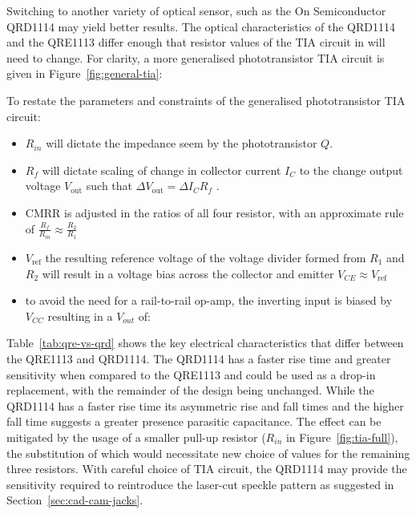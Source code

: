 Switching to another variety of optical sensor, such as the On Semiconductor
QRD1114 \cite{onsemiconductor_qrd1114_2024} may yield better results. The
optical characteristics of the QRD1114 \cite{onsemiconductor_qrd1114_2024} and
the QRE1113 \cite{onsemiconductor_qre1113_2024} differ enough that resistor
values of the TIA circuit in \textcite{mcpherson_portable_2013} will need to
change. For clarity, a more generalised phototransistor TIA circuit is given in
Figure~\ref{fig:general-tia}:

To restate the parameters and constraints of the generalised phototransistor TIA
circuit:

\begin{itemize}
    \item $R_{in}$ will dictate the impedance seem by the phototransistor $Q$.
    \item $R_{f}$ will dictate scaling of change in collector current $I_{C}$ to
          the change output voltage $V_{\text{out}}$ such that $\Delta V_{\text{out}}
              = \Delta I_C R_f$  \cite{mcpherson_portable_2013}.
    \item CMRR is adjusted in the ratios of all four resistor, with an
          approximate rule of $\frac{R_f}{R_{in}} \approx \frac{R_2}{R_1}$
    \item $V_{\text{ref}}$ the resulting reference voltage of the voltage
          divider formed from $R_1$ and $R_2$ will result in a voltage bias across the
          collector and emitter $V_{CE} \approx V_{\text{ref}}$
    \item to avoid the need for a rail-to-rail op-amp, the inverting input is
          biased by $V_{CC}$ resulting in a $V_{out}$ of:
\end{itemize}


Table~\ref{tab:qre-vs-qrd} shows the key electrical characteristics that differ
between the QRE1113 and QRD1114. The QRD1114 has a faster rise time and greater
sensitivity \cite{onsemiconductor_qrd1114_2024} when compared to the QRE1113
\cite{onsemiconductor_qre1113_2024} and could be used as a drop-in replacement,
with the remainder of the design being unchanged. While the QRD1114 has a faster
rise time its asymmetric rise and fall times and the higher fall time suggests a
greater presence parasitic capacitance. The effect can be mitigated by the usage
of a smaller pull-up resistor ($R_{in}$ in Figure~\ref{fig:tia-full}), the
substitution of which would necessitate new choice of values for the remaining
three resistors. With careful choice of TIA circuit, the QRD1114 may provide the
sensitivity required to reintroduce the laser-cut speckle pattern as suggested
in Section~\ref{sec:cad-cam-jacks}.

